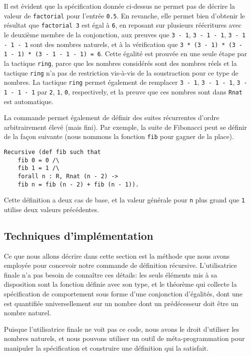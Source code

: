 \documentclass{modjflart}
\begin{document}
Il est évident que la spécification donnée ci-dessus ne permet pas de
décrire la valeur de \texttt{factorial} pour l'entrée \texttt{0.5}.
En revanche, elle permet bien d'obtenir le résultat que
\texttt{factorial 3} est égal à \texttt{6}, en reposant sur plusieurs
réécritures avec le deuxième membre de la conjonction, aux preuves que
\texttt{3 - 1}, \texttt{3 - 1 - 1}, \texttt{3 - 1 - 1 - 1} sont des
nombres naturels, et à la vérification que \texttt{3 * (3 - 1) * (3 -
  1 - 1) * (3 - 1 - 1 - 1) = 6}.  Cette égalité est prouvée en une
seule étape par la tactique \texttt{ring}, parce que les nombres
considérés sont des nombres réels et la tactique \texttt{ring} n'a pas de
restriction vis-à-vis de la soustraction pour ce type de nombres.  La
tactique \texttt{ring} permet également de remplacer
\texttt{3 - 1}, \texttt{3 - 1 - 1}, \texttt{3 - 1 - 1 - 1} par
\texttt{2}, \texttt{1}, \texttt{0},
respectively, et la preuve que ces nombres sont dans \texttt{Rnat} est
automatique.

La commande permet
également de définir des suites récurrentes d'ordre arbitrairement élevé
(mais fini).  Par exemple,  la suite de Fibonacci peut se définir de la façon
suivante (nous nommons la fonction \texttt{fib} pour gagner de la place).
\begin{verbatim}
Recursive (def fib such that
    fib 0 = 0 /\
    fib 1 = 1 /\
    forall n : R, Rnat (n - 2) ->
    fib n = fib (n - 2) + fib (n - 1)).
\end{verbatim}
Cette définition a deux cas de base, et la valeur générale pour
\texttt{n} plus grand que \texttt{1} utilise deux valeurs précédentes.

\subsection{Techniques d'implémentation}
Ce que nous allons décrire dans cette section est la méthode que nous avons
employée pour concevoir notre commande de définition récursive.
L'utilisatrice finale n'a pas besoin de connaître ces détails: les
seuls éléments mis à sa disposition sont la fonction définie avec son
type, et le théorème qui collecte la spécification de comportement
sous forme d'une conjonction d'égalités, dont une est quantifiée
universellement sur un nombre dont un prédécesseur doit être un nombre
naturel.

Puisque l'utilisatrice finale ne voit pas ce code, nous avons le droit
d'utiliser les nombres naturels, et nous pouvons utiliser un outil de
méta-programmation pour manipuler la spécification
et construire une définition qui la satisfait.
\end{document}
